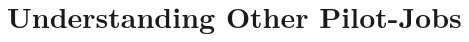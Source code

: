 \documentclass[conference,final]{IEEEtran}
\newcommand{\jhanote}[1]{ {\textcolor{red} { ***shantenu: #1 }}}
\newcommand{\jhanote}[1]{}
\newcommand{\upp}{\vspace*{-0.5em}}
\begin{document}
% 
% 


\section{Understanding Other Pilot-Jobs\upp\upp}



\end{document}
